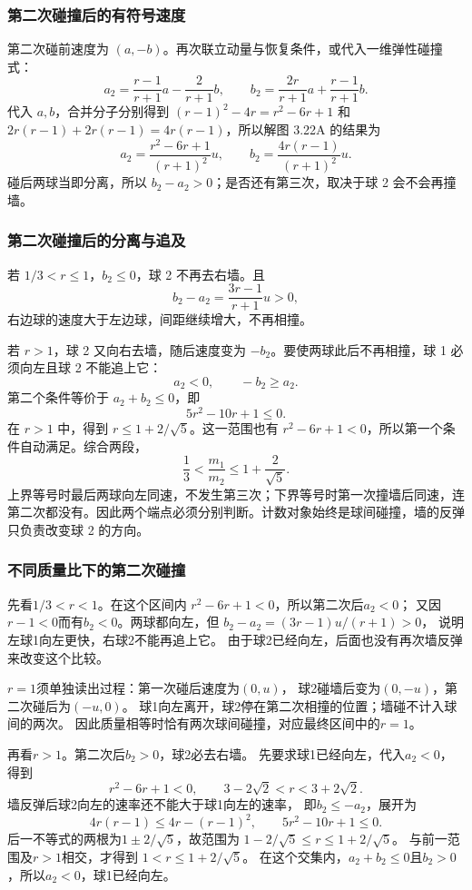 \documentclass[UTF8,fontset=fandol,a4paper,11pt]{ctexart}
\begin{document}
\subsubsection*{第二次碰撞后的有符号速度}
第二次碰前速度为 $(a,-b)$。再次联立动量与恢复条件，或代入一维弹性碰撞式：
\[
a_2=\frac{r-1}{r+1}a-\frac{2}{r+1}b,\qquad
b_2=\frac{2r}{r+1}a+\frac{r-1}{r+1}b.
\]
代入 $a,b$，合并分子分别得到 $(r-1)^2-4r=r^2-6r+1$ 和 $2r(r-1)+2r(r-1)=4r(r-1)$，所以解图 3.22A 的结果为
\[
a_2=\frac{r^2-6r+1}{(r+1)^2}u,\qquad
b_2=\frac{4r(r-1)}{(r+1)^2}u.
\]
碰后两球当即分离，所以 $b_2-a_2>0$；是否还有第三次，取决于球 2 会不会再撞墙。

\subsubsection*{第二次碰撞后的分离与追及}
若 $1/3<r\leq1$，$b_2\leq0$，球 2 不再去右墙。且
\[
b_2-a_2=\frac{3r-1}{r+1}u>0,
\]
右边球的速度大于左边球，间距继续增大，不再相撞。

若 $r>1$，球 2 又向右去墙，随后速度变为 $-b_2$。要使两球此后不再相撞，球 1 必须向左且球 2 不能追上它：
\[
a_2<0,\qquad -b_2\geq a_2.
\]
第二个条件等价于 $a_2+b_2\leq0$，即
\[
5r^2-10r+1\leq0.
\]
在 $r>1$ 中，得到 $r\leq1+2/\sqrt5$。这一范围也有
$r^2-6r+1<0$，所以第一个条件自动满足。综合两段，
\[
\boxed{\frac13<\frac{m_1}{m_2}\leq1+\frac2{\sqrt5}}.
\]
上界等号时最后两球向左同速，不发生第三次；下界等号时第一次撞墙后同速，连第二次都没有。因此两个端点必须分别判断。计数对象始终是球间碰撞，墙的反弹只负责改变球 2 的方向。
\subsubsection*{不同质量比下的第二次碰撞}
先看$1/3<r<1$。在这个区间内
$r^2-6r+1<0$，所以第二次后$a_2<0$；
又因$r-1<0$而有$b_2<0$。两球都向左，但
$b_2-a_2=(3r-1)u/(r+1)>0$，
说明左球1向左更快，右球2不能再追上它。
由于球2已经向左，后面也没有再次墙反弹来改变这个比较。

$r=1$须单独读出过程：第一次碰后速度为$(0,u)$，
球2碰墙后变为$(0,-u)$，第二次碰后为$(-u,0)$。
球1向左离开，球2停在第二次相撞的位置；墙碰不计入球间的两次。
因此质量相等时恰有两次球间碰撞，对应最终区间中的$r=1$。

再看$r>1$。第二次后$b_2>0$，球2必去右墙。
先要求球1已经向左，代入$a_2<0$，得到
\[
r^2-6r+1<0,
\qquad 3-2\sqrt2<r<3+2\sqrt2.
\]
墙反弹后球2向左的速率还不能大于球1向左的速率，
即$b_2\leq-a_2$，展开为
\[
4r(r-1)\leq4r-(r-1)^2,
\qquad5r^2-10r+1\leq0.
\]
后一不等式的两根为$1\pm2/\sqrt5$，故范围为
$1-2/\sqrt5\leq r\leq1+2/\sqrt5$。
与前一范围及$r>1$相交，才得到
$1<r\leq1+2/\sqrt5$。
在这个交集内，$a_2+b_2\leq0$且$b_2>0$，所以$a_2<0$，球1已经向左。
\end{document}
